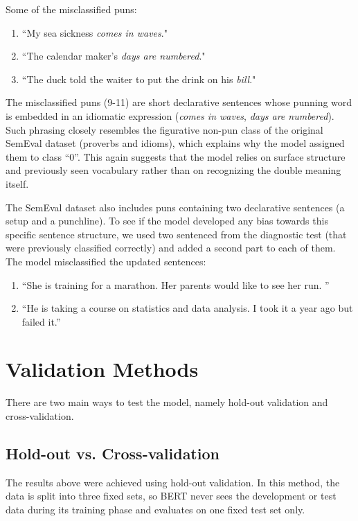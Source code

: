 \documentclass[11pt,a4paper]{article}
\begin{document}
\vspace{4pt}
Some of the misclassified puns:

\begin{enumerate}
    \item[(9)] ``My sea sickness \textit{comes in waves}."
    \item[(10)] ``The calendar maker's \textit{days are numbered}."
    \item[(11)] ``The duck told the waiter to put the drink on his \textit{bill}."
\end{enumerate}

The misclassified puns (9-11) are short declarative sentences whose punning word is embedded in an idiomatic expression (\textit{comes in waves}, \textit{days are numbered}). Such phrasing closely resembles the figurative non-pun class of the original SemEval dataset (proverbs and idioms), which explains why the model assigned them to class ``0''. This again suggests that the model relies on surface structure and previously seen vocabulary rather than on recognizing the double meaning itself.

The SemEval dataset also includes puns containing two declarative sentences (a setup and a punchline). To see if the model developed any bias towards this specific sentence structure, we used two sentenced from the diagnostic test (that were previously classified correctly) and added a second part to each of them. The model misclassified the updated sentences:

\begin{enumerate}
    \item[(12)] ``She is training for a marathon. Her parents would like to see her run. '' 
    \item[(13)] ``He is taking a course on statistics and data analysis. I took it a year ago but failed it.''
\end{enumerate}


\section{Validation Methods}
There are two main ways to test the model, namely hold-out validation and cross-validation. 

\subsection{Hold-out vs. Cross-validation}
The results above were achieved using hold-out validation. In this method, the data is split into three fixed sets, so BERT never sees the development or test data during its training phase and evaluates on one fixed test set only.
\end{document}
